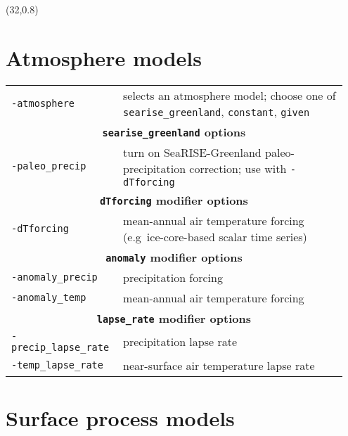\documentclass[landscape]{article}
\newcommand{\tabletitle}[1]{\multicolumn{2}{c}{\textbf{#1}}}
\begin{document}
\begin{textblock}{15}(32,0.8)


\section{Atmosphere models}
\label{sec:atmosphere-models}

\begin{tabular}{@{}p{0.3\linewidth}p{0.65\linewidth}@{}}
\texttt{-atmosphere} & selects an atmosphere model; choose one of
\mbox{\texttt{searise_greenland}}, \texttt{constant},
\mbox{\texttt{given}}\\
\tabletitle{\texttt{searise_greenland} options}\\
\texttt{-paleo_precip} & turn on SeaRISE-Greenland paleo-precipitation
correction; use with \texttt{-dTforcing}\\
\tabletitle{\texttt{dTforcing} modifier options} \\
\texttt{-dTforcing} & mean-annual air temperature forcing (e.g~ice-core-based 
scalar time series)\\
\tabletitle{\texttt{anomaly} modifier options}\\
\texttt{-anomaly_precip} & precipitation forcing\\
\texttt{-anomaly_temp} & mean-annual air temperature forcing\\
\tabletitle{\texttt{lapse_rate} modifier options}\\
\texttt{-precip_lapse_rate} & precipitation lapse rate\\
\texttt{-temp_lapse_rate} & near-surface air temperature lapse rate
\end{tabular}

\section{Surface process models}
\label{sec:surface-models}


\end{textblock}
\end{document}
